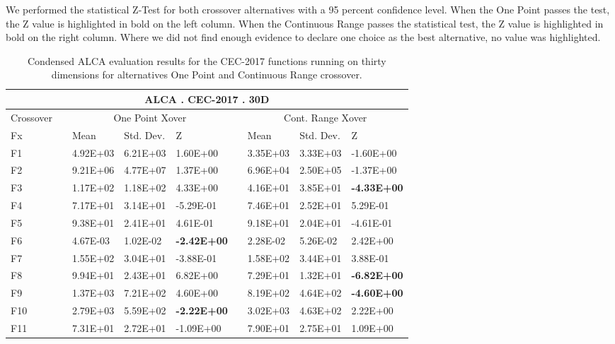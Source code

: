 \documentclass[graybox]{svmult}
\begin{document}
    \FloatBarrier

    We performed the statistical Z-Test for both crossover alternatives with a 95 percent confidence level. When the One Point passes the test, the Z value is highlighted in bold on the left column. When the Continuous Range passes the statistical test, the Z value is highlighted in bold on the right column. Where we did not find enough evidence to declare one choice as the best alternative, no value was highlighted.

    \begin{table}[]
    \scriptsize
    \centering
    \caption{Condensed ALCA evaluation results for the CEC-2017 functions running on thirty dimensions for alternatives One Point and Continuous Range crossover.}\label{tab.condensed_evaluation_30D}    
    \begin{tabular}{@{}lllllllll@{}}
    \toprule
    \multicolumn{9}{c}{\textbf{ALCA . CEC-2017 . 30D}} \\ \midrule
    Crossover &  & \multicolumn{3}{c}{One Point Xover} &  & \multicolumn{3}{c}{Cont. Range Xover} \\
    Fx &  & Mean & Std. Dev. & Z &  & Mean & Std. Dev. & Z \\
    F1 &  & 4.92E+03 & 6.21E+03 & 1.60E+00 &  & 3.35E+03 & 3.33E+03 & -1.60E+00 \\
    F2 &  & 9.21E+06 & 4.77E+07 & 1.37E+00 &  & 6.96E+04 & 2.50E+05 & -1.37E+00 \\
    F3 &  & 1.17E+02 & 1.18E+02 & 4.33E+00 &  & 4.16E+01 & 3.85E+01 & \textbf{-4.33E+00} \\
    F4 &  & 7.17E+01 & 3.14E+01 & -5.29E-01 &  & 7.46E+01 & 2.52E+01 & 5.29E-01 \\
    F5 &  & 9.38E+01 & 2.41E+01 & 4.61E-01 &  & 9.18E+01 & 2.04E+01 & -4.61E-01 \\
    F6 &  & 4.67E-03 & 1.02E-02 & \textbf{-2.42E+00} &  & 2.28E-02 & 5.26E-02 & 2.42E+00 \\
    F7 &  & 1.55E+02 & 3.04E+01 & -3.88E-01 &  & 1.58E+02 & 3.44E+01 & 3.88E-01 \\
    F8 &  & 9.94E+01 & 2.43E+01 & 6.82E+00 &  & 7.29E+01 & 1.32E+01 & \textbf{-6.82E+00} \\
    F9 &  & 1.37E+03 & 7.21E+02 & 4.60E+00 &  & 8.19E+02 & 4.64E+02 & \textbf{-4.60E+00} \\
    F10 &  & 2.79E+03 & 5.59E+02 & \textbf{-2.22E+00} &  & 3.02E+03 & 4.63E+02 & 2.22E+00 \\
    F11 &  & 7.31E+01 & 2.72E+01 & -1.09E+00 &  & 7.90E+01 & 2.75E+01 & 1.09E+00 \\

\end{tabular}
\end{table}
\end{document}
